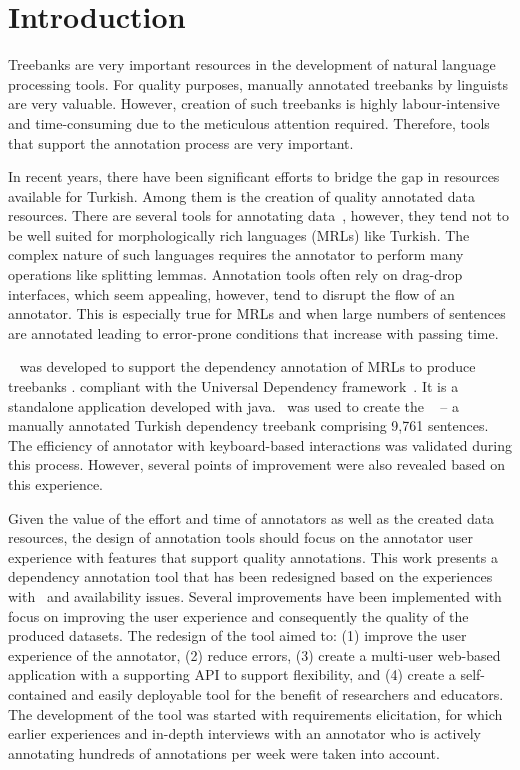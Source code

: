 \section{Introduction}
\label{sec:introduction}

Treebanks are very important resources in the development of natural language processing tools.
For quality purposes, manually annotated treebanks by linguists are very valuable. 
However, creation of such treebanks is highly labour-intensive and time-consuming due to the meticulous attention required.
Therefore, tools that support the annotation process are very important. 

In recent years, there have been significant efforts to bridge the gap in resources available for Turkish. 
Among them is the creation of quality annotated data resources. 
There are several tools for annotating data~\cite{brat,dgannotator}, however, they tend not to be well suited for morphologically rich languages (MRLs) like Turkish.
The complex nature of such languages requires the annotator to perform many operations like splitting lemmas.
Annotation tools often rely on drag-drop interfaces, which seem appealing, however, tend to disrupt the flow of an annotator. 
This is especially true for MRLs and when  large numbers of sentences are annotated  leading to error-prone conditions that increase with passing time. 

\boatvone~\cite{trk2020resources} was developed to support the dependency annotation of MRLs to produce treebanks .
compliant with the Universal Dependency framework~\cite{UD}. 
It is a standalone application developed with java.
\boatvone\ was used to create the \bountreebank~\cite{turk-etal-2019-turkish,trk2020resources,UD-Boun-Treebank} -- a manually annotated Turkish dependency treebank comprising 9,761 sentences.
The efficiency of annotator with keyboard-based interactions was validated during this process. 
However, several points of improvement were also revealed based on this experience.  

Given the value of the effort and time of annotators as well as the created data resources, the design of annotation tools should focus on the annotator user experience with features that support quality annotations. 
This work presents a dependency annotation tool that has been redesigned based on the experiences with \boatvone\ and availability issues.
Several improvements have been implemented with focus on improving the user experience and consequently the quality of the produced datasets.
The redesign of the tool aimed to: (1) improve the user experience of the annotator, (2) reduce errors, (3) create a multi-user web-based application with a supporting API to support flexibility, and (4) create a self-contained and easily deployable tool for the benefit of researchers and educators. 
The development of the tool was started with requirements elicitation, for which earlier experiences and in-depth interviews with an annotator who is actively annotating hundreds of annotations per week were taken into account.

